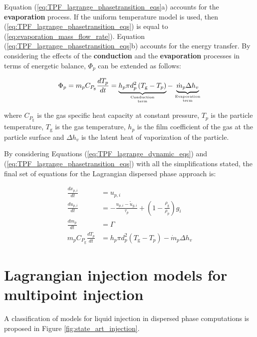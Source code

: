 Equation (\ref{eq:TPF_lagrange_phasetransition_eqs}a) accounts for the \textbf{evaporation} process. If the uniform temperature model is used, then (\ref{eq:TPF_lagrange_phasetransition_eqs}) is equal to (\ref{eq:evaporation_mass_flow_rate}). Equation (\ref{eq:TPF_lagrange_phasetransition_eqs}b) accounts for the energy transfer. By considering the effects of the \textbf{conduction} and the \textbf{evaporation} processes in terms of energetic balance, $\Phi_p$ can be extended as follows:

\begin{equation}
\Phi_p = m_p C_{P_\mathrm{g}} \frac{d T_p}{d t} = \underbrace{ h_p \pi d_p^2 \left( T_\mathrm{g} - T_p \right) }_{\text{Conduction}\atop\text{term}} - \underbrace{ \dot{m}_p  \Delta h_v }_{\text{Evaporation}\atop\text{term}}
\end{equation}

where $C_{P_\mathrm{g}}$ is the gas specific heat capacity at constant pressure, $T_p$ is the particle temperature, $T_\mathrm{g}$ is the gas temperature, $h_p$ is the film coefficient of the gas at the particle surface and $\Delta h_v$ is the latent heat of vaporization of the particle. 

By considering Equations (\ref{eq:TPF_lagrange_dynamic_eqs}) and (\ref{eq:TPF_lagrange_phasetransition_eqs}) with all the simplifications stated, the final set of equations for the Lagrangian dispersed phase approach is:

\begin{subequations}
\begin{align}
\frac{d x_{p,i}}{d t} &= u_{p,i} \\
\frac{d u_{p,i}}{d t} &= - \frac{u_{p,i} - \widetilde{u}_{g,i} }{\tau_p} + \left( 1 - \frac{\rho_\mathrm{g}}{\rho_p} \right) g_i \\
\frac{d m_p}{d t} &= \Gamma \\
m_p C_{P_\mathrm{g}} \frac{d T_p}{d t} &= h_p \pi d_p^2 \left( T_\mathrm{g} - T_p \right) - \dot{m}_p  \Delta h_v
\end{align}
\end{subequations}

\section{Lagrangian injection models for multipoint injection}
\label{sec:ch3_state_art_lagrangian_injection}

A classification of models for liquid injection in dispersed phase computations is proposed in Figure \ref{fig:state_art_injection}.

